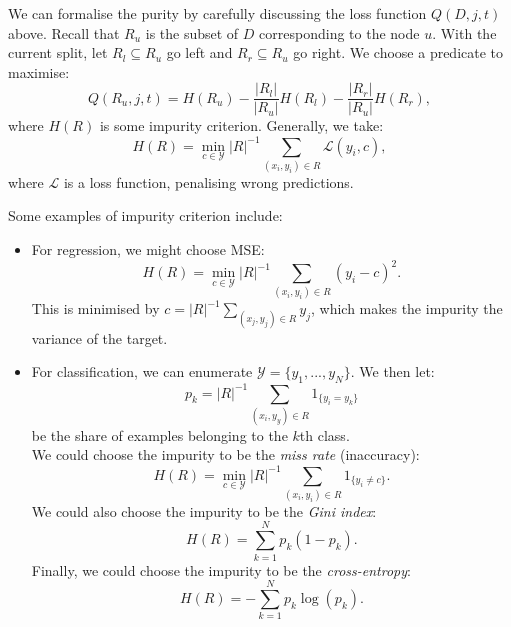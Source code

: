 We can formalise the purity by carefully discussing the loss function $Q(D,j,t)$ above. Recall that $R_u$ is the subset of $D$ corresponding to the node $u$. With the current split, let $R_l \subseteq R_u$ go left and $R_r \subseteq R_u$ go right. We choose a predicate to maximise:
\begin{equation*}
Q(R_u, j, t) = H(R_u) - \frac{|R_l|}{|R_u|} H(R_l) - \frac{|R_r|}{|R_u|} H(R_r),
\end{equation*}
where $H(R)$ is some impurity criterion. Generally, we take:
\begin{equation*}
H(R) = \min_{c \in \mathcal{Y}} |R|^{-1} \sum_{(x_i,y_i) \in R} \mathcal{L}(y_i, c),
\end{equation*}
where $\mathcal{L}$ is a loss function, penalising wrong predictions.

\begin{frameex}
Some examples of impurity criterion include:
\begin{itemize}
\item For regression, we might choose MSE:
\begin{equation*}
H(R) = \min_{c \in \mathcal{Y}} |R|^{-1} \sum_{(x_i,y_i) \in R} (y_i - c)^2.
\end{equation*}
This is minimised by $c = |R|^{-1} \displaystyle \sum_{(x_j,y_j) \in R} y_j$, which makes the impurity the variance of the target.
\item For classification, we can enumerate $\mathcal{Y} = \{y_1,...,y_N\}$. We then let:
\begin{equation*}
p_k = |R|^{-1} \sum_{(x_i,y_y) \in R} 1_{\{y_i = y_k\}}
\end{equation*}
be the share of examples belonging to the $k$th class.\\

We could choose the impurity to be the \textit{miss rate} (inaccuracy):
\begin{equation*}
H(R) = \min_{c \in \mathcal{Y}} |R|^{-1} \sum_{(x_i,y_i) \in R} 1_{\{y_i \neq c\}}.
\end{equation*}
We could also choose the impurity to be the \textit{Gini index}:
\begin{equation*}
H(R) = \sum_{k=1}^{N} p_k(1-p_k).
\end{equation*}
Finally, we could choose the impurity to be the \textit{cross-entropy}:
\begin{equation*}
H(R) = -\sum_{k=1}^{N} p_k \log(p_k).
\end{equation*}
\end{itemize}
\end{frameex}



